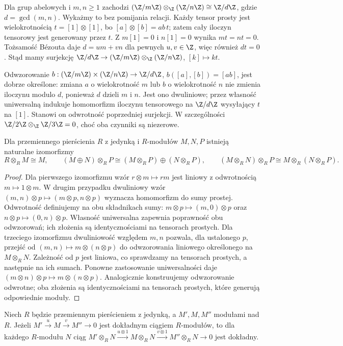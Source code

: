 \begin{przyklad}
Dla grup abelowych i $m,n\ge1$ zachodzi
$(\Z/m\Z)\otimes_\Z(\Z/n\Z)\cong\Z/d\Z$,
gdzie $d=\gcd(m,n)$. Wykażmy to bez pomijania
relacji. Każdy tensor prosty jest wielokrotnością
$t=[1]\otimes[1]$, bo
$[a]\otimes[b]=ab\,t$; zatem cały iloczyn
tensorowy jest generowany przez $t$.
Z $m[1]=0$ i $n[1]=0$ wynika $mt=nt=0$.
Tożsamość Bézouta daje $d=um+vn$ dla pewnych
$u,v\in\Z$, więc również $dt=0$.
Stąd mamy surjekcję
$\Z/d\Z\to(\Z/m\Z)\otimes_\Z(\Z/n\Z)$,
$[k]\mapsto kt$.

Odwzorowanie
$b:(\Z/m\Z)\times(\Z/n\Z)\to\Z/d\Z$,
$b([a],[b])=[ab]$, jest dobrze określone:
zmiana $a$ o wielokrotność $m$ lub $b$ o
wielokrotność $n$ nie zmienia iloczynu modulo $d$,
ponieważ $d$ dzieli $m$ i $n$.
Jest ono dwuliniowe; przez własność uniwersalną
indukuje homomorfizm iloczynu tensorowego na
$\Z/d\Z$ wysyłający $t$ na $[1]$.
Stanowi on odwrotność poprzedniej surjekcji.
W szczególności $\Z/2\Z\otimes_\Z\Z/3\Z=0$,
choć oba czynniki są niezerowe.
\end{przyklad}
\begin{stwierdzenie}
Dla przemiennego pierścienia $R$ z jedynką i
$R$-modułów $M,N,P$ istnieją naturalne izomorfizmy
\[
R\otimes_RM\cong M,\qquad
(M\oplus N)\otimes_RP\cong(M\otimes_RP)\oplus(N\otimes_RP),
\qquad (M\otimes_RN)\otimes_RP\cong M\otimes_R(N\otimes_RP).
\]
\end{stwierdzenie}
\begin{proof}
Dla pierwszego izomorfizmu wzór $r\otimes m\mapsto rm$
jest liniowy z odwrotnością $m\mapsto1\otimes m$.
W drugim przypadku dwuliniowy wzór
$(m,n)\otimes p\mapsto(m\otimes p,n\otimes p)$
wyznacza homomorfizm do sumy prostej.
Odwrotność definiujemy na obu składnikach sumy:
$m\otimes p\mapsto(m,0)\otimes p$ oraz
$n\otimes p\mapsto(0,n)\otimes p$.
Własność uniwersalna zapewnia poprawność obu odwzorowań;
ich złożenia są identycznościami na tensorach prostych.
Dla trzeciego izomorfizmu dwuliniowość względem
$m,n$ pozwala, dla ustalonego $p$, przejść od
$(m,n)\mapsto m\otimes(n\otimes p)$
do odwzorowania liniowego określonego na $M\otimes_RN$.
Zależność od $p$ jest liniowa, co sprawdzamy na
tensorach prostych, a następnie na ich sumach.
Ponowne zastosowanie uniwersalności daje
$(m\otimes n)\otimes p\mapsto m\otimes(n\otimes p)$.
Analogicznie konstruujemy odwzorowanie odwrotne; oba złożenia
są identycznościami na tensorach prostych,
które generują odpowiednie moduły.
\end{proof}
\begin{twierdzenie}
Niech $R$ będzie przemiennym pierścieniem z jedynką,
a $M',M,M''$ modułami nad $R$.
Jeżeli $M'\xrightarrow{u}M\xrightarrow{v}M''\to0$ jest
dokładnym ciągiem $R$-modułów, to dla każdego
$R$-modułu $N$ ciąg
$M'\otimes_RN\xrightarrow{u\otimes1}M\otimes_RN
\xrightarrow{v\otimes1}M''\otimes_RN\to0$ jest dokładny.
\end{twierdzenie}
